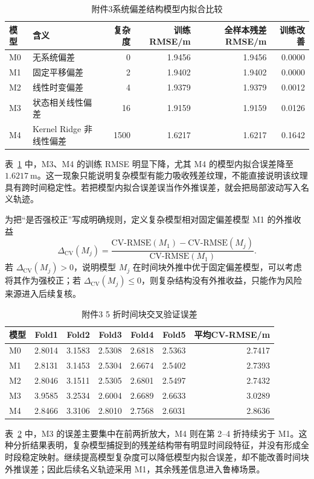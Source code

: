 \documentclass{cumcmthesis}
\begin{document}
\begin{table}[H]
  \centering
  \caption{附件3系统偏差结构模型内拟合比较}
  \label{tab:bias_structure}
  \small
  \begin{tabular}{llrrrr}
    \toprule
    模型 & 含义 & 复杂度 & 训练RMSE/m & 全样本残差RMSE/m & 训练改善\\
    \midrule
    M0 & 无系统偏差 & 0 & 1.9456 & 1.9456 & 0.0000\\
    M1 & 固定平移偏差 & 2 & 1.9402 & 1.9402 & 0.0000\\
    M2 & 线性时变偏差 & 4 & 1.9379 & 1.9379 & 0.0012\\
    M3 & 状态相关线性偏差 & 16 & 1.9159 & 1.9159 & 0.0126\\
    M4 & Kernel Ridge 非线性偏差 & 1500 & 1.6217 & 1.6217 & 0.1642\\
    \bottomrule
  \end{tabular}
\end{table}
表~\ref{tab:bias_structure} 中，M3、M4 的训练 RMSE 明显下降，尤其 M4 的模型内拟合误差降至 $1.6217\ \mathrm{m}$。这一现象只能说明复杂模型有能力吸收残差纹理，不能直接说明该纹理具有跨时间稳定性。若把模型内拟合误差误当作外推误差，就会把局部波动写入名义轨迹。

为把“是否强校正”写成明确规则，定义复杂模型相对固定偏差模型 M1 的外推收益
\[
  \Delta_{\mathrm{CV}}(M_j)=
  \frac{\mathrm{CV\text{-}RMSE}(M_1)-\mathrm{CV\text{-}RMSE}(M_j)}
  {\mathrm{CV\text{-}RMSE}(M_1)}.
\]
若 $\Delta_{\mathrm{CV}}(M_j)>0$，说明模型 $M_j$ 在时间块外推中优于固定偏差模型，可以考虑将其作为强校正；若 $\Delta_{\mathrm{CV}}(M_j)\le0$，则复杂结构没有外推收益，只能作为风险来源进入后续复核。

\begin{table}[H]
  \centering
  \caption{附件3 5 折时间块交叉验证误差}
  \label{tab:bias_cv_folds}
  \small
  \begin{tabular}{lrrrrrr}
    \toprule
    模型 & Fold1 & Fold2 & Fold3 & Fold4 & Fold5 & 平均CV-RMSE/m\\
    \midrule
    M0 & 2.8014 & 3.1583 & 2.5308 & 2.6818 & 2.5363 & 2.7417\\
    M1 & 2.8131 & 3.1453 & 2.5304 & 2.6674 & 2.5402 & 2.7393\\
    M2 & 2.8046 & 3.1511 & 2.5305 & 2.6801 & 2.5497 & 2.7432\\
    M3 & 3.9585 & 3.2534 & 2.6004 & 2.6689 & 2.6633 & 3.0289\\
    M4 & 2.8466 & 3.3106 & 2.8010 & 2.7568 & 2.6031 & 2.8636\\
    \bottomrule
  \end{tabular}
\end{table}
表~\ref{tab:bias_cv_folds} 中，M3 的误差主要集中在前两折放大，M4 则在第 2--4 折持续劣于 M1。这种分折结果表明，复杂模型捕捉到的残差结构带有明显时间段特征，并没有形成全时段稳定映射。继续提高模型复杂度可以降低模型内拟合误差，却不能改善时间块外推误差；因此后续名义轨迹采用 M1，其余残差信息进入鲁棒场景。
\end{document}
